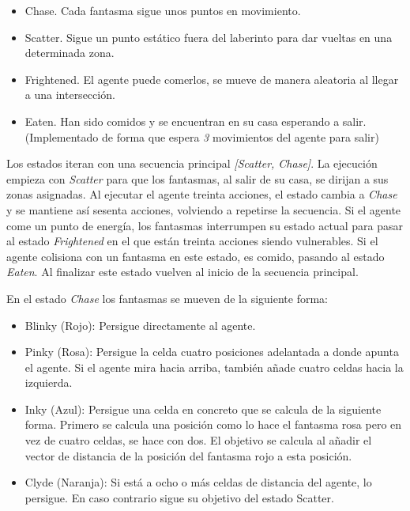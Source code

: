 		\begin{itemize}
			\item Chase. Cada fantasma sigue unos puntos en movimiento.
			\vspace*{-0.3cm}
			\item Scatter. Sigue un punto estático fuera del laberinto para dar vueltas en una determinada zona.
			\vspace*{-0.3cm}
			\item Frightened. El agente puede comerlos, se mueve de manera aleatoria al llegar a una intersección.
			\vspace*{-0.3cm}
			\item Eaten. Han sido comidos y se encuentran en su casa esperando a salir. (Implementado de forma que espera \textit{3} movimientos del agente para salir)
		\end{itemize} 
		
		Los estados iteran con una secuencia principal \textit{[Scatter, Chase]}. La ejecución empieza con \textit{Scatter} para que los fantasmas, al salir de su casa, se dirijan a sus zonas asignadas. Al ejecutar el agente treinta acciones, el estado cambia a \textit{Chase} y se mantiene así sesenta acciones, volviendo a repetirse la secuencia. Si el agente come un punto de energía, los fantasmas interrumpen su estado actual para pasar al estado \textit{Frightened} en el que están treinta acciones siendo vulnerables. Si el agente colisiona con un fantasma en este estado, es comido, pasando al estado \textit{Eaten}. Al finalizar este estado vuelven al inicio de la secuencia principal.
		
		
		\begin{flushleft}
			En el estado \textit{Chase} los fantasmas se mueven de la siguiente forma:
		\end{flushleft}
		
		\vspace{-0.9cm}
		\begin{itemize}
			\item Blinky (Rojo): Persigue directamente al agente.
			\vspace*{-0.3cm}
			\item Pinky (Rosa): Persigue la celda cuatro posiciones adelantada a donde apunta el agente. Si el agente mira hacia arriba, también añade cuatro celdas hacia la izquierda.
			\vspace*{-0.3cm}
			\item Inky (Azul): Persigue una celda en concreto que se calcula de la siguiente forma. Primero se calcula una posición como lo hace el fantasma rosa pero en vez de cuatro celdas, se hace con dos. El objetivo se calcula al añadir el vector de distancia de la posición del fantasma rojo a esta posición.
			\vspace*{-0.3cm}
			\item Clyde (Naranja): Si está a ocho o más celdas de distancia del agente, lo persigue. En caso contrario sigue su objetivo del estado Scatter.
		\end{itemize}
		
